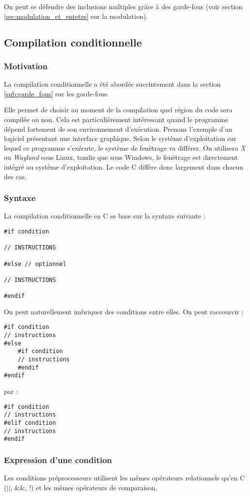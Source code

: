 \documentclass[../../../main.tex]{subfiles}
\begin{document}
On peut se défendre des inclusions multiples grâce à des garde-fous (voir section \ref{sec:modulation_et_entetes} sur la modulation).
\subsection{Compilation conditionnelle} \label{sub:compilation_conditionnelle}
\subsubsection{Motivation}
La compilation conditionnelle a été abordée succintement dans la section \ref{sub:garde_fous} sur les garde-fous.

Elle permet de choisir au moment de la compilation quel région du code sera compilée ou non. Cela est particulièrement intéressant quand le programme dépend fortement de son environnement d'exécution. Prenons l'exemple d'un logiciel présentant une interface graphique. Selon le système d'exploitation sur lequel ce programme s'exécute, le système de fenêtrage va différer. On utilisera \textit{X} ou \textit{Wayland} sous Linux, tandis que sous Windows, le fenêtrage est directement intégré au système d'exploitation. Le code C diffère donc largement dans chacun des cas.
\subsubsection{Syntaxe}
La compilation conditionnelle en C se base sur la syntaxe suivante :
\begin{verbatim}
#if condition

// INSTRUCTIONS

#else // optionnel

// INSTRUCTIONS

#endif
\end{verbatim}
On peut naturellement imbriquer des conditions entre elles. On peut raccourcir :
\begin{verbatim}
#if condition
// instructions
#else
	#if condition
	// instructions
	#endif
#endif
\end{verbatim}
par :
\begin{verbatim}
#if condition
// instructions
#elif condition
// instructions
#endif
\end{verbatim}
\subsubsection{Expression d'une condition}
Les conditions préprocesseurs utilisent les mêmes opérateurs relationnels qu'en C ($||$, $\&\&$, $!$) et les mêmes opérateurs de comparaison.
\end{document}
